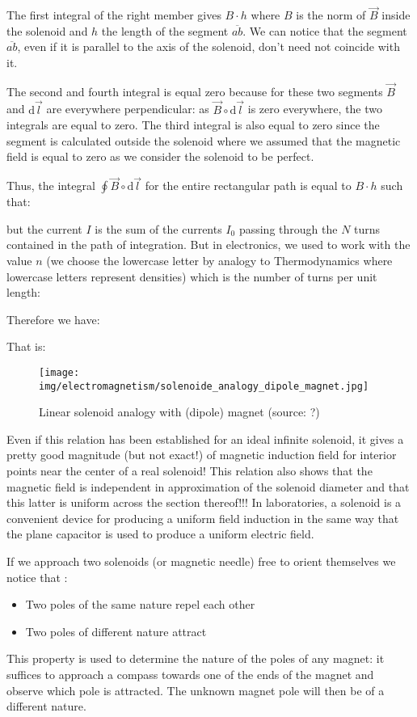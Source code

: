 	The first integral of the right member gives $B\cdot h$ where $B$ is the norm of $\vec{B}$ inside the solenoid and $h$ the length of the segment $\overline{ab}$. We can notice that the segment $\overline{ab}$, even if it is parallel to the axis of the solenoid, don't need not coincide with it.
	
	The second and fourth integral is equal zero because for these two segments $\vec{B}$ and $\mathrm{d}\vec{l}$ are everywhere perpendicular: as $\vec{B}\circ\mathrm{d}\vec{l}$ is zero everywhere, the two integrals are equal to zero. The third integral is also equal to zero since the segment is calculated outside the solenoid where we assumed that the magnetic field is equal to zero as we consider the solenoid to be perfect.	
	
	Thus, the integral $\oint\vec{B}\circ\mathrm{d}\vec{l}$ for the entire rectangular path is equal to $B\cdot h$ such that:
	
	but the current $I$ is the sum of the currents $I_0$ passing through the $N$ turns contained in the path of integration. But in electronics, we used to work with the value $n$ (we choose the lowercase letter by analogy to Thermodynamics where lowercase letters represent densities) which is the number of turns per unit length:
	
	Therefore we have:
	
	That is:
	
	\begin{figure}[H]
		\centering
		\texttt{[image: img/electromagnetism/solenoide\_analogy\_dipole\_magnet.jpg]}
		\caption[Linear solenoid analogy with (dipole) magnet]{Linear solenoid analogy with (dipole) magnet (source: ?)}
	\end{figure}
	Even if this relation has been established for an ideal infinite solenoid, it gives a pretty good magnitude (but not exact!) of magnetic induction field for interior points near the center of a real solenoid! This relation also shows that the magnetic field is independent in approximation of the solenoid diameter and that this latter is uniform across the section thereof!!! In laboratories, a solenoid is a convenient device for producing a uniform field induction in the same way that the plane capacitor is used to produce a uniform electric field.
	
	If we approach two solenoids (or magnetic needle) free to orient themselves we notice that :
	\begin{itemize}
		\item Two poles of the same nature repel each other
		\item Two poles of different nature attract
	\end{itemize}
	This property is used to determine the nature of the poles of any magnet: it suffices to approach a compass towards one of the ends of the magnet and observe which pole is attracted. The unknown magnet pole will then be of a different nature.
	
